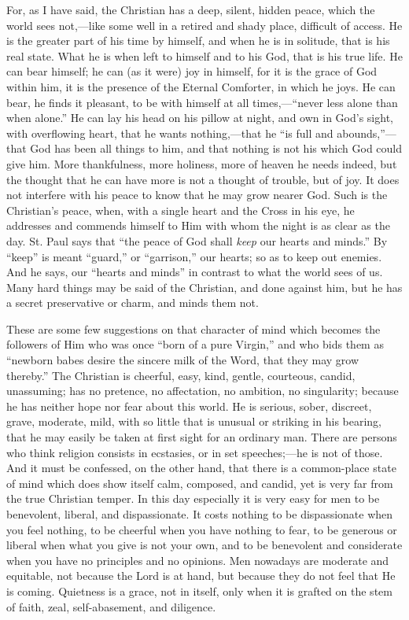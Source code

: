 For, as I have said, the Christian has a deep, silent, hidden
peace, which the world sees not,—like some well in a retired and
shady place, difficult of access. He is the greater part of his time
by himself, and when he is in solitude, that is his real state. What
he is when left to himself and to his God, that is his true life. He
can bear himself; he can (as it were) joy in himself, for it is the
grace of God within him, it is the presence of the Eternal Comforter,
in which he joys. He can bear, he finds it pleasant, to be with
himself at all times,—``never less alone than when alone.''
He can lay his head on his pillow at night, and own in God's sight,
with overflowing heart, that he wants nothing,—that he ``is full
and abounds,''—that God has been all things to him, and that
nothing is not his which God could give him. More thankfulness, more
holiness, more of heaven he needs indeed, but the thought that he can
have more is not a thought of trouble, but of joy. It does not
interfere with his peace to know that he may grow nearer God. Such is
the Christian's peace, when, with a single heart and the Cross in his
eye, he addresses and commends himself to Him with whom the night is
as clear as the day. St. Paul says that ``the peace of God shall \emph{keep}
our hearts and minds.'' By ``keep'' is meant
``guard,'' or ``garrison,'' our hearts; so as to keep
out enemies. And he says, our ``hearts and minds'' in contrast
to what the world sees of us. Many hard things may be said of the
Christian, and done against him, but he has a secret preservative or
charm, and minds them not.

These are some few suggestions on that character of mind which
becomes the followers of Him who was once ``born of a pure
Virgin,'' and who bids them as ``newborn babes desire the
sincere milk of the Word, that they may grow thereby.'' The
Christian is cheerful, easy, kind, gentle, courteous, candid,
unassuming; has no pretence, no affectation, no ambition, no
singularity; because he has neither hope nor fear about this world. He
is serious, sober, discreet, grave, moderate, mild, with so little
that is unusual or striking in his bearing, that he may easily be
taken at first sight for an ordinary man. There are persons who think
religion consists in ecstasies, or in set speeches;—he is not of
those. And it must be confessed, on the other hand, that there is a
common-place state of mind which does show itself calm, composed, and
candid, yet is very far from the true Christian temper. In this day
especially it is very easy for men to be benevolent, liberal, and
dispassionate. It costs nothing to be dispassionate when you feel
nothing, to be cheerful when you have nothing to fear, to be generous
or liberal when what you give is not your own, and to be benevolent
and considerate when you have no principles and no opinions. Men
nowadays are moderate and equitable, not because the Lord is at hand,
but because they do not feel that He is coming. Quietness is a grace,
not in itself, only when it is grafted on the stem of faith, zeal,
self-abasement, and diligence.

